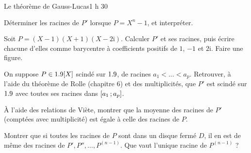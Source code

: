 \begin{defi}{Le théorème de Gauss-Lucas}{1 h 30}
\begin{questions}[resume]
  \item Déterminer les racines de $P'$ lorsque $P=X^{n}-1$, et
    interpréter.
  \item Soit $P=(X-1)(X+1)(X-2\mathrm{i})$. Calculer $P'$ et ses racines,
    puis écrire chacune d'elles comme barycentre à coefficients positifs de
    $1$, $-1$ et $2\mathrm{i}$. Faire une figure.
  \item On suppose $P\in1.9[X]$ scindé sur $1.9$, de racines
    $a_1<\dots<a_p$. Retrouver, à l'aide du théorème de Rolle (chapitre 6)
    et des multiplicités, que $P'$ est scindé sur $1.9$ avec toutes ses
    racines dans $\mathopen{[}a_1\,{;}\,a_p\mathclose{]}$.
\end{questions}

\begin{questions}[resume]
  \item À l'aide des relations de Viète, montrer que la moyenne des
    racines de $P'$ (comptées avec multiplicité) est égale à celle des
    racines de $P$.
  \item Montrer que si toutes les racines de $P$ sont dans un disque
    fermé $D$, il en est de même des racines de $P',P'',\dots,P^{(n-1)}$.
    Que vaut l'unique racine de $P^{(n-1)}$ ?
\end{questions}
\end{defi}
